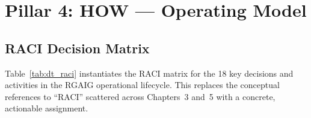 
\section{Pillar 4: HOW --- Operating Model}
\label{sec:dt_operating_model}

\subsection{RACI Decision Matrix}
\label{sec:dt_raci}

Table~\ref{tab:dt_raci} instantiates the RACI matrix for the 18 key decisions and activities in the RGAIG operational lifecycle. This replaces the conceptual references to ``RACI'' scattered across Chapters~3 and~5 with a concrete, actionable assignment.


